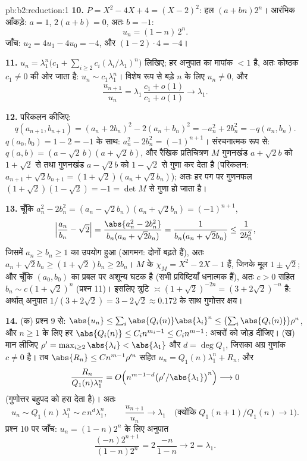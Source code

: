 \begin{solution}{pb:b2:reduction:1}
\textbf{10.} $P = X^2 - 4X + 4 = (X - 2)^2$: हल $(a +
bn)2^n$। आरंभिक आँकड़े: $a = 1$, $2(a + b) = 0$, अतः $b = -1$:
\[
u_n = (1 - n)\,2^n .
\]
जाँच: $u_2 = 4u_1 - 4u_0 = -4$, और $(1 - 2)\cdot4 = -4$।

\textbf{11.} $u_n = \lambda_1^n\bigl(c_1 + \sum_{i\geq2}
c_i(\lambda_i/\lambda_1)^n\bigr)$ लिखिए; हर अनुपात का मापांक $< 1$ है, अतः कोष्ठक $c_1 \neq 0$ की
ओर जाता है: $u_n \sim c_1\lambda_1^n$। विशेष रूप से बड़े $n$ के लिए $u_n \neq 0$, और
\[
\frac{u_{n+1}}{u_n} =
\lambda_1\,\frac{c_1 + o(1)}{c_1 + o(1)} \longrightarrow
\lambda_1 .
\]

\textbf{12.} परिकलन कीजिए:
\[
q(a_{n+1}, b_{n+1}) = (a_n + 2b_n)^2 - 2(a_n + b_n)^2
= -a_n^2 + 2b_n^2 = -q(a_n, b_n).
\]
$q(a_0, b_0) = 1 - 2 = -1$ के साथ: $a_n^2 - 2b_n^2 = (-1)^{n+1}$। संरचनात्मक रूप से: $q(a, b) = (a - \sqrt2\,b)(a + \sqrt2\,b)$, और रैखिक प्रतिचित्रण $M$
गुणनखंड $a + \sqrt2 b$ को $1 +
\sqrt2$ से तथा गुणनखंड $a - \sqrt2 b$ को $1 - \sqrt2$ से गुणा कर देता है
(परिकलन: $a_{n+1} + \sqrt2 b_{n+1} = (1 + \sqrt2)(a_n + \sqrt2 b_n)$); अतः हर पग पर गुणनफल $(1 + \sqrt2)(1 - \sqrt2) = -1 =
\det M$ से गुणा हो जाता है।

\textbf{13.} चूँकि $a_n^2 - 2b_n^2 = (a_n - \sqrt2 b_n)(a_n +
\sqrt2 b_n) = (-1)^{n+1}$,
\[
\Bigl|\frac{a_n}{b_n} - \sqrt2\Bigr|
= \frac{\abs{a_n^2 - 2b_n^2}}{b_n(a_n + \sqrt2 b_n)}
= \frac{1}{b_n(a_n + \sqrt2 b_n)} \leq \frac1{2b_n^2},
\]
जिसमें $a_n \geq b_n \geq 1$ का उपयोग हुआ (आगमन: दोनों बढ़ते हैं), अतः $a_n +
\sqrt2 b_n \geq (1 + \sqrt2)b_n \geq 2b_n$। $M$ के
 $\chi_M = X^2 - 2X - 1$ हैं, जिनके मूल $1 \pm \sqrt2$; और चूँकि $(a_0, b_0)$ का प्रबल
 पर अशून्य घटक है (सभी प्रविष्टियाँ धनात्मक हैं), अतः
$c > 0$ सहित $b_n \sim c(1 + \sqrt2)^n$ (प्रश्न 11)। इसलिए त्रुटि $\asymp (1 + \sqrt2)^{-2n} = (3 +
2\sqrt2)^{-n}$ है: अर्थात् अनुपात $1/(3 + 2\sqrt2) = 3
- 2\sqrt2 \approx 0.172$
के साथ गुणोत्तर क्षय।

\textbf{14.} (क) प्रश्न 9 से: $\abs{u_n} \leq \sum_i
\abs{Q_i(n)}\abs{\lambda_i}^n \leq \bigl(\sum_i
\abs{Q_i(n)}\bigr)\rho^n$, और $n \geq 1$ के लिए हर $\abs{Q_i(n)} \leq C_i
n^{m_i - 1} \leq C_i n^{m-1}$: अचरों को जोड़
दीजिए। (ख) मान लीजिए $\rho' = \max_{i \geq 2}\abs{\lambda_i} <
\abs{\lambda_1}$ और $d = \deg Q_1$, जिसका अग्र गुणांक $c
\neq 0$ है। तब $\abs{R_n}
\leq Cn^{m-1}\rho'^n$
सहित $u_n = Q_1(n)\lambda_1^n + R_n$, और
\[
\frac{R_n}{Q_1(n)\lambda_1^n} = O\Bigl(n^{m-1-d}
\bigl(\rho'/\abs{\lambda_1}\bigr)^n\Bigr) \longrightarrow 0
\]
(गुणोत्तर बहुपद को हरा देता है)। अतः
\[
u_n \sim Q_1(n)\,\lambda_1^n \sim c\,n^d\lambda_1^n,
\qquad
\frac{u_{n+1}}{u_n} \longrightarrow \lambda_1
\quad\text{(क्योंकि } Q_1(n{+}1)/Q_1(n) \to 1\text{)}.
\]
प्रश्न 10 पर जाँच: $u_n = (1-n)2^n$ के लिए अनुपात
\[
\frac{(-n)2^{n+1}}{(1-n)2^n} = 2\,\frac{-n}{1-n}
\longrightarrow 2 = \lambda_1 .
\]


\end{solution}
